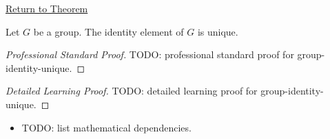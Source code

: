 \newpage
{}
\label{prf:group-identity-unique}

\begin{remark*}[Return]
\hyperref[prop:group-identity-unique]{Return to Theorem}
\end{remark*}

\begin{proposition*}
Let $G$ be a group. The identity element of $G$ is unique.
\end{proposition*}

\begin{proof}[Professional Standard Proof]
\LRAProofBodyStart
TODO: professional standard proof for group-identity-unique.
\end{proof}

\begin{proof}[Detailed Learning Proof]
\LRAProofBodyStart
TODO: detailed learning proof for group-identity-unique.
\end{proof}

\begin{remark*}
\end{remark*}

\begin{dependencies}
\begin{itemize}
  \item TODO: list mathematical dependencies.
\end{itemize}
\end{dependencies}

\clearpage
